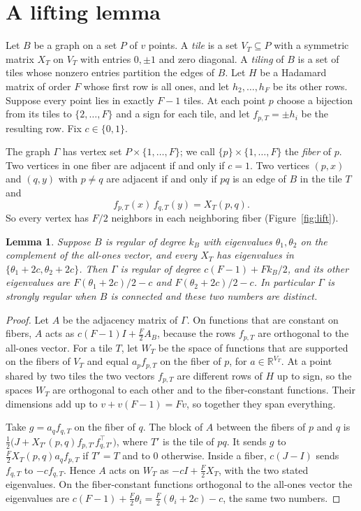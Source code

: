 \documentclass[11pt]{amsart}
\newtheorem{lemma}[theorem]{Lemma}
\theoremstyle{remark}
\begin{document}
\section{A lifting lemma}\label{sec:lemma}

Let $B$ be a graph on a set $P$ of $v$ points. A \emph{tile} is a set $V_T\subseteq P$ with a symmetric matrix $X_T$ on $V_T$ with entries $0,\pm1$ and zero diagonal. A \emph{tiling} of $B$ is a set of tiles whose nonzero entries partition the edges of $B$. Let $H$ be a Hadamard matrix of order $F$ whose first row is all ones, and let $h_2,\dots,h_F$ be its other rows. Suppose every point lies in exactly $F-1$ tiles. At each point $p$ choose a bijection from its tiles to $\{2,\dots,F\}$ and a sign for each tile, and let $f_{p,T}=\pm h_i$ be the resulting row. Fix $c\in\{0,1\}$.

The graph $\Gamma$ has vertex set $P\times\{1,\dots,F\}$; we call $\{p\}\times\{1,\dots,F\}$ the \emph{fiber} of $p$. Two vertices in one fiber are adjacent if and only if $c=1$. Two vertices $(p,x)$ and $(q,y)$ with $p\ne q$ are adjacent if and only if $pq$ is an edge of $B$ in the tile $T$ and
\[
f_{p,T}(x)\,f_{q,T}(y)=X_T(p,q).
\]
So every vertex has $F/2$ neighbors in each neighboring fiber (Figure~\ref{fig:lift}).

\begin{lemma}\label{lem:lift}
Suppose $B$ is regular of degree $k_B$ with eigenvalues $\theta_1,\theta_2$ on the complement of the all-ones vector, and every $X_T$ has eigenvalues in $\{\theta_1+2c,\theta_2+2c\}$. Then $\Gamma$ is regular of degree $c(F-1)+Fk_B/2$, and its other eigenvalues are $F(\theta_1+2c)/2-c$ and $F(\theta_2+2c)/2-c$. In particular $\Gamma$ is strongly regular when $B$ is connected and these two numbers are distinct.
\end{lemma}

\begin{proof}
Let $A$ be the adjacency matrix of $\Gamma$. On functions that are constant on fibers, $A$ acts as $c(F-1)I+\tfrac F2A_B$, because the rows $f_{p,T}$ are orthogonal to the all-ones vector. For a tile $T$, let $W_T$ be the space of functions that are supported on the fibers of $V_T$ and equal $a_pf_{p,T}$ on the fiber of $p$, for $a\in\mathbb R^{V_T}$. At a point shared by two tiles the two vectors $f_{p,T}$ are different rows of $H$ up to sign, so the spaces $W_T$ are orthogonal to each other and to the fiber-constant functions. Their dimensions add up to $v+v(F-1)=Fv$, so together they span everything.

Take $g=a_qf_{q,T}$ on the fiber of $q$. The block of $A$ between the fibers of $p$ and $q$ is $\tfrac12\bigl(J+X_{T'}(p,q)f_{p,T'}f_{q,T'}^{\top}\bigr)$, where $T'$ is the tile of $pq$. It sends $g$ to $\tfrac F2X_T(p,q)a_qf_{p,T}$ if $T'=T$ and to $0$ otherwise. Inside a fiber, $c(J-I)$ sends $f_{q,T}$ to $-cf_{q,T}$. Hence $A$ acts on $W_T$ as $-cI+\tfrac F2X_T$, with the two stated eigenvalues. On the fiber-constant functions orthogonal to the all-ones vector the eigenvalues are $c(F-1)+\tfrac F2\theta_i=\tfrac F2(\theta_i+2c)-c$, the same two numbers.
\end{proof}
\end{document}

